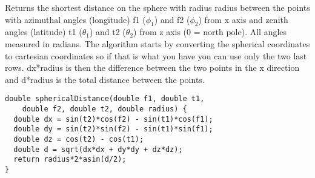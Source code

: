 Returns the shortest distance on the sphere with radius radius between the points with azimuthal angles (longitude) f1 ($\phi_1$) and f2 ($\phi_2$) from x axis and zenith angles (latitude) t1 ($\theta_1$) and t2 ($\theta_2$) from z axis (0 = north pole). All angles measured in radians. The algorithm starts by converting the spherical coordinates to cartesian coordinates so if that is what you have you can use only the two last rows. dx*radius is then the difference between the two points in the x direction and d*radius is the total distance between the points.
\begin{verbatim}
double sphericalDistance(double f1, double t1,
    double f2, double t2, double radius) {
  double dx = sin(t2)*cos(f2) - sin(t1)*cos(f1);
  double dy = sin(t2)*sin(f2) - sin(t1)*sin(f1);
  double dz = cos(t2) - cos(t1);
  double d = sqrt(dx*dx + dy*dy + dz*dz);
  return radius*2*asin(d/2);
}
\end{verbatim}
